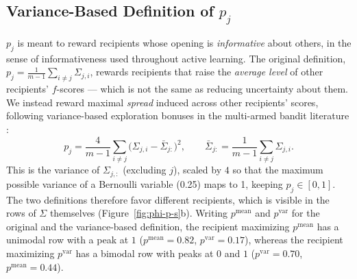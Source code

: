 \subsection{Variance-Based Definition of $p_j$}
\label{sec:variance-p}

$p_j$ is meant to reward recipients whose opening is \emph{informative}
about others, in the sense of informativeness used throughout active
learning. The original definition,
$p_j = \frac{1}{m-1}\sum_{i\ne j}\Sigma_{j,i}$, rewards recipients that
raise the \emph{average level} of other recipients' $f$-scores --- which is
not the same as reducing uncertainty about them. We instead reward maximal
\emph{spread} induced across other recipients' scores, following
variance-based exploration bonuses in the multi-armed bandit literature
\citep{audibert2009exploration}:
\begin{equation}
\label{eq:p-variance}
p_j = \frac{4}{m-1}\sum_{i\ne j}\big(\Sigma_{j,i} - \bar\Sigma_{j:}\big)^2,
\qquad
\bar\Sigma_{j:} = \frac{1}{m-1}\sum_{i\ne j}\Sigma_{j,i}.
\end{equation}
This is the variance of $\Sigma_{j,:}$ (excluding $j$), scaled by $4$ so
that the maximum possible variance of a Bernoulli variable (0.25) maps to
1, keeping $p_j \in [0,1]$.
The two definitions therefore favor different recipients, which is visible in
the rows of $\Sigma$ themselves (Figure~\ref{fig:phi-p-s}b). Writing
$p^{\mathrm{mean}}$ and $p^{\mathrm{var}}$ for the original and the
variance-based definition, the recipient maximizing $p^{\mathrm{mean}}$ has a
unimodal row with a peak at $1$ ($p^{\mathrm{mean}}=0.82$,
$p^{\mathrm{var}}=0.17$), whereas the recipient maximizing $p^{\mathrm{var}}$
has a bimodal row with peaks at $0$ and $1$ ($p^{\mathrm{var}}=0.70$,
$p^{\mathrm{mean}}=0.44$).
